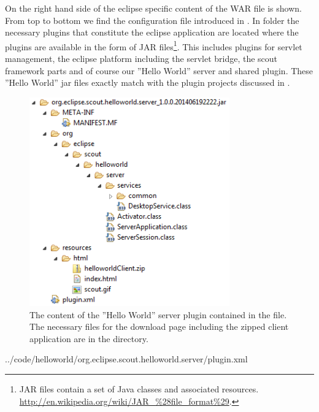 \documentclass[a4paper,10pt,twoside]{book}
\begin{document}
On the right hand side of  the eclipse specific content of the WAR file is shown.
From top to bottom we find the configuration file  introduced in .
In folder  the necessary plugins that constitute the eclipse application are located where the plugins are available in the form of JAR files\footnote{
JAR files contain a set of Java classes and associated resources. \url{http://en.wikipedia.org/wiki/JAR_\%28file_format\%29}.
}.
This includes plugins for servlet management, the eclipse platform including the servlet bridge, the scout framework parts and of course our ''Hello World'' server and shared plugin.
These ''Hello World'' jar files exactly match with the plugin projects discussed in .

\begin{figure}
\includegraphics[height=9cm]{helloworld_server_war_plugin.png} 
\caption{The content of the ''Hello World'' server plugin contained in the  file.
The necessary files for the download page including the zipped client application are in the  directory.} 
\end{figure}


{../code/helloworld/org.eclipse.scout.helloworld.server/plugin.xml}
\end{document}
